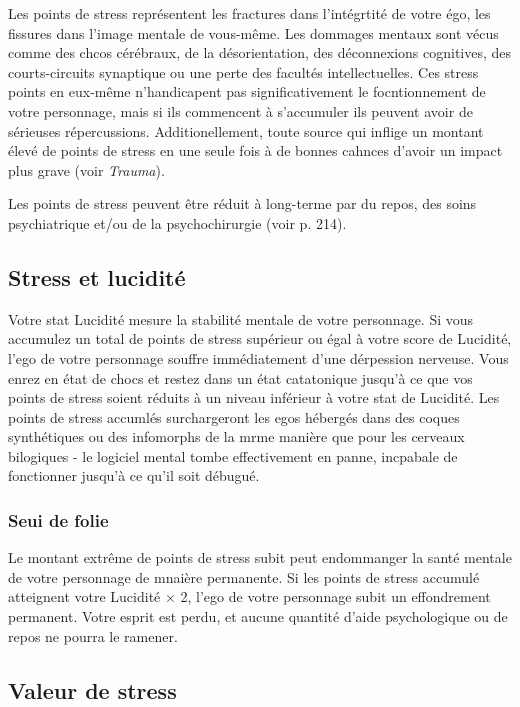 Les points de stress représentent les fractures dans l'intégrtité de votre égo, les fissures dans l'image mentale de vous-même. Les dommages mentaux sont vécus comme des chcos cérébraux, de la désorientation, des déconnexions cognitives, des courts-circuits synaptique ou une perte des facultés intellectuelles. Ces stress points en eux-même n'handicapent pas significativement le focntionnement de votre personnage, mais si ils commencent à s'accumuler ils peuvent avoir de sérieuses répercussions. Additionellement, toute source qui inflige un montant élevé de points de stress en une seule fois à de bonnes cahnces d'avoir un impact plus grave (voir \emph{Trauma}). 

Les points de stress peuvent être réduit à long-terme par du repos, des soins psychiatrique et/ou de la psychochirurgie (voir p. 214). 



\subsection{Stress et lucidité} \label{sec:lucidity-stress} 

Votre stat Lucidité mesure la stabilité mentale de votre personnage. Si vous accumulez un total de points de stress supérieur ou égal à votre score de Lucidité, l'ego de votre personnage souffre immédiatement d'une dérpession nerveuse. Vous enrez en état de chocs et restez dans un état catatonique jusqu'à ce que vos points de stress soient réduits à un niveau inférieur à votre stat de Lucidité. Les points de stress accumlés surchargeront les egos hébergés dans des coques synthétiques ou des infomorphs de la mrme manière que pour les cerveaux bilogiques - le logiciel mental tombe effectivement en panne, incpabale de fonctionner jusqu'à ce qu'il soit débugué. 

\subsubsection{Seui de folie} 

Le montant extrême de points de stress subit peut endommanger la santé mentale de votre personnage de mnaière permanente. Si les points de stress accumulé atteignent votre Lucidité $\times$ 2, l'ego de votre personnage subit un effondrement permanent. Votre esprit est perdu, et aucune quantité d'aide psychologique ou de repos ne pourra le ramener. 



\subsection{Valeur de stress} \label{sec:stress-value} 

